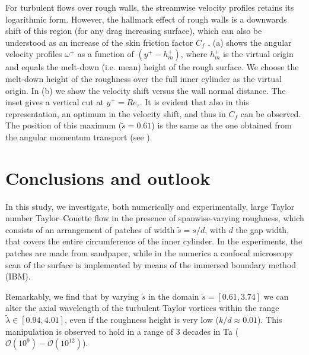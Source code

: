 For turbulent flows over rough walls, the streamwise velocity profiles retains its logarithmic form. However, the hallmark effect of rough walls is a downwards shift of this region (for any drag increasing surface), which can also be understood as an increase of the skin friction factor $C_f$ \citep{Hama1954}. (a) shows the angular velocity profiles $\omega^+$ as a function of  $(y^+-h_m^+)$, where $h_m^+$ is the virtual origin and equals the melt-down (i.e. mean) height of the rough surface. We choose the melt-down height of the roughness over the full inner cylinder as the virtual origin. In (b) we show the velocity shift versus the wall normal distance. The inset gives a vertical cut at $y^+ = Re_\tau$. It is evident that also in this representation, an optimum in the velocity shift, and thus in  $C_f$ can be observed. The position of this maximum ($\tilde s = 0.61$) is the same as the one obtained from the angular momentum transport (see ).

\FloatBarrier
\section{Conclusions and outlook}
\label{sec:conclusions}
In this study, we investigate, both numerically and experimentally, large Taylor number Taylor--Couette flow in the presence of spanwise-varying roughness, which consists of an arrangement of patches of width $\tilde s = s/d$, with $d$ the gap width, that covers the entire circumference of the inner cylinder. In the experiments, the patches are made from sandpaper, while in the numerics a confocal microscopy scan of the surface is implemented by means of the immersed boundary method (IBM). 

Remarkably, we find that by varying $\tilde s$ in the domain $\tilde s = [0.61, 3.74]$ we can alter the axial wavelength  of the turbulent Taylor vortices within the range $\tilde{\lambda}\in[0.94,4.01]$, even if the roughness height is very low ($k/d\approx 0.01$). This manipulation is observed to hold in a range of 3 decades in Ta ($\mathcal{O}(10^9)-\mathcal{O}(10^{12})$).

